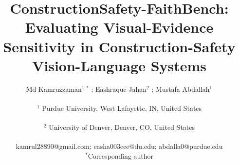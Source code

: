 \documentclass[12pt,letterpaper]{article}
\date{}
\makeatletter
\newcommand{\Author}[2]{%
    #1$^{#2}$%
}
\newcommand{\Affiliation}[2]{%
    $^{#1}$#2
}
\renewcommand{\maketitle}{
    \begin{center}
        {\fontsize{16}{19}\selectfont
        \bfseries
        \@title\par}
        \vspace{8pt}
        {\fontsize{12}{14}\selectfont
        \@author\par}
    \end{center}
    \vspace{6pt}
}
\makeatother
\begin{document}

\title{
    \vspace{-1.0cm}
    \fontsize{16}{19}\selectfont
    \bfseries
    ConstructionSafety-FaithBench: Evaluating Visual-Evidence Sensitivity
    in Construction-Safety Vision-Language Systems
}

\author{
    \Author{Md Kamruzzaman}{1,*};
    \Author{Eashraque Jahan}{2};
    \Author{Mustafa Abdallah}{1}
    \\[4pt]
    \Affiliation{1}{
        Purdue University, West Lafayette, IN, United States
    }
    \\
    \Affiliation{2}{
        University of Denver, Denver, CO, United States
    }
    \\[4pt]
    kamrul28890@gmail.com;
    easha003eee@du.edu;
    abdalla0@purdue.edu
    \\[2pt]
    $^{*}$Corresponding author
}

\maketitle

\vspace{-0.6cm}
\end{document}
